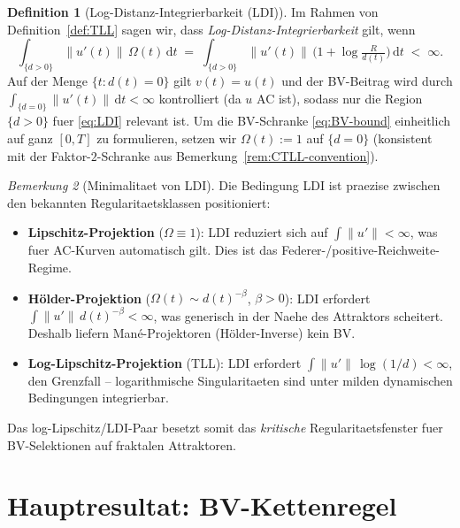 \documentclass[12pt,a4paper]{article}
\theoremstyle{definition}
\newtheorem{definition}{Definition}[section]
\theoremstyle{plain}
\theoremstyle{remark}
\newtheorem{remark}[definition]{Bemerkung}
\begin{document}
\begin{definition}[Log-Distanz-Integrierbarkeit (LDI)]
\label{def:LDI}
Im Rahmen von Definition~\ref{def:TLL} sagen wir, dass
\emph{Log-Distanz-Integrierbarkeit} gilt, wenn
\begin{equation}\label{eq:LDI}
  \int_{\{d>0\}} \|u'(t)\|\,\Omega(t)\,\mathrm{d}t
  \;=\;
  \int_{\{d>0\}} \|u'(t)\|\,
  \bigl(1 + \log\tfrac{R}{d(t)}\bigr)\,\mathrm{d}t
  \;<\; \infty.
  \tag{LDI}
\end{equation}
Auf der Menge $\{t : d(t) = 0\}$ gilt $v(t) = u(t)$ und der
BV-Beitrag wird durch $\int_{\{d=0\}} \|u'(t)\|\,\mathrm{d}t
< \infty$ kontrolliert (da $u$ AC ist), sodass nur die Region
$\{d > 0\}$ fuer \eqref{eq:LDI} relevant ist.  Um die
BV-Schranke \eqref{eq:BV-bound} einheitlich auf ganz $[0,T]$
zu formulieren, setzen wir $\Omega(t) := 1$ auf $\{d=0\}$
(konsistent mit der Faktor-$2$-Schranke aus
Bemerkung~\ref{rem:CTLL-convention}).
\end{definition}

\begin{remark}[Minimalitaet von LDI]
\label{rem:LDI-minimal}
Die Bedingung LDI ist praezise zwischen den bekannten
Regularitaetsklassen positioniert:
\begin{itemize}
  \item \textbf{Lipschitz-Projektion} ($\Omega \equiv 1$):
    LDI reduziert sich auf $\int \|u'\| < \infty$, was fuer
    AC-Kurven automatisch gilt.  Dies ist das Federer-/positive-Reichweite-Regime.
  \item \textbf{H\"older-Projektion} ($\Omega(t) \sim d(t)^{-\beta}$,
    $\beta > 0$): LDI erfordert $\int \|u'\|\,d(t)^{-\beta} < \infty$,
    was generisch in der Naehe des Attraktors scheitert.  Deshalb
    liefern Man\'e-Projektoren (H\"older-Inverse) kein BV.
  \item \textbf{Log-Lipschitz-Projektion} (TLL):
    LDI erfordert $\int \|u'\|\,\log(1/d) < \infty$, den
    Grenzfall -- logarithmische Singularitaeten sind unter milden
    dynamischen Bedingungen integrierbar.
\end{itemize}
Das log-Lipschitz/LDI-Paar besetzt somit das \emph{kritische}
Regularitaetsfenster fuer BV-Selektionen auf fraktalen Attraktoren.
\end{remark}


\section{Hauptresultat: BV-Kettenregel}
\label{sec:main}
\end{document}
